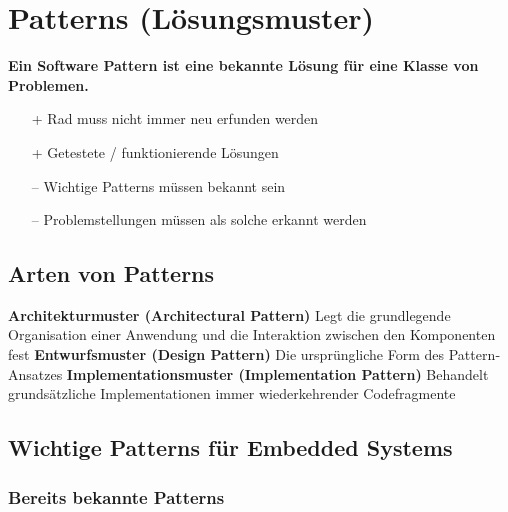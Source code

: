 \section{Patterns (Lösungsmuster)}

\textbf{Ein Software Pattern ist eine bekannte Lösung für eine Klasse von Problemen.}

\vspace{0.1cm}

\begin{minipage}[t]{0.48\columnwidth}
    \raggedright

    \begin{itemize}
        \item[+] Rad muss nicht immer neu erfunden werden 
        \item[+] Getestete / funktionierende Lösungen 
    \end{itemize}
\end{minipage}
\hfill
\begin{minipage}[t]{0.48\columnwidth}
    \raggedright

    \begin{itemize}
        \item[--] Wichtige Patterns müssen bekannt sein
        \item[--] Problemstellungen müssen als solche erkannt werden 
    \end{itemize}
\end{minipage}


\subsection{Arten von Patterns}

\begin{outline}
    \1 \textbf{Architekturmuster (Architectural Pattern)}
        \2 Legt die grundlegende Organisation einer Anwendung und die Interaktion zwischen den Komponenten fest
    \1 \textbf{Entwurfsmuster (Design Pattern)}
        \2 Die ursprüngliche Form des Pattern‐Ansatzes
    \1 \textbf{Implementationsmuster (Implementation Pattern)}
        \2 Behandelt grundsätzliche Implementationen immer wiederkehrender Codefragmente
\end{outline}


\subsection{Wichtige Patterns für Embedded Systems}

\subsubsection{Bereits bekannte Patterns}

